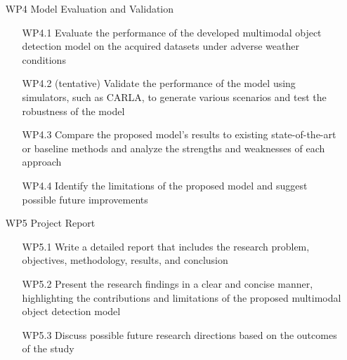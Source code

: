 \documentclass[rnd]{mas_proposal}
\begin{document}
\begin{enumerate}
\begin{itemize}
      \end{itemize}
      
      \item[WP4] Model Evaluation and Validation
      \begin{itemize}
            
            \item[WP4.1] Evaluate the performance of the developed multimodal object detection model on the acquired datasets under adverse weather conditions
            \item[WP4.2] (tentative) Validate the performance of the model using simulators, such as CARLA, to generate various scenarios and test the robustness of the model
            \item[WP4.3] Compare the proposed model's results to existing state-of-the-art or baseline methods and analyze the strengths and weaknesses of each approach
            \item[WP4.4] Identify the limitations of the proposed model and suggest possible future improvements
            
      \end{itemize}
      
      \item[WP5] Project Report
      \begin{itemize}
            
            \item[WP5.1] Write a detailed report that includes the research problem, objectives, methodology, results, and conclusion
            \item[WP5.2] Present the research findings in a clear and concise manner, highlighting the contributions and limitations of the proposed multimodal object detection model
            \item[WP5.3] Discuss possible future research directions based on the outcomes of the study
            
      \end{itemize}

\end{enumerate}
\end{document}
